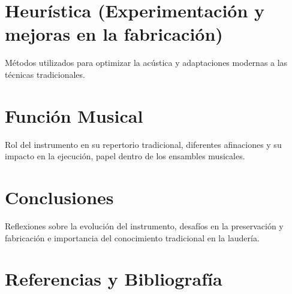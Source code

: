\documentclass[a4paper,12pt]{article}
\begin{document}
\section{Heurística (Experimentación y mejoras en la fabricación)}
Métodos utilizados para optimizar la acústica y adaptaciones modernas a las técnicas tradicionales.

\section{Función Musical}
Rol del instrumento en su repertorio tradicional, diferentes afinaciones y su impacto en la ejecución, papel dentro de los ensambles musicales.

\section{Conclusiones}
Reflexiones sobre la evolución del instrumento, desafíos en la preservación y fabricación e importancia del conocimiento tradicional en la laudería.

\section{Referencias y Bibliografía}

\end{document}
